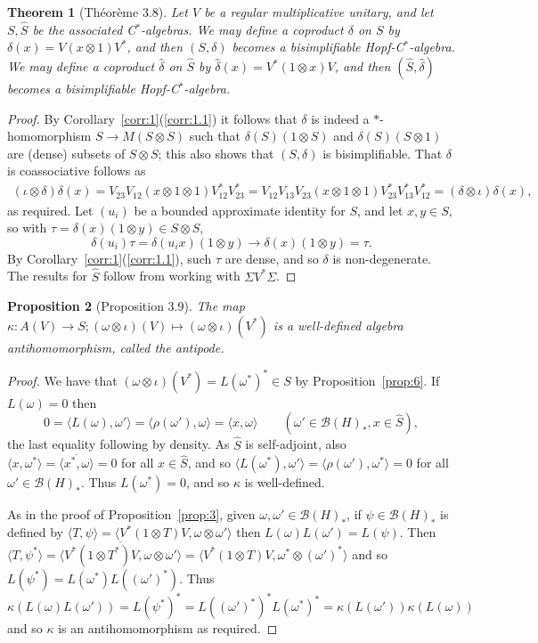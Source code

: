 \documentclass[a4paper,12pt]{article}
\theoremstyle{plain}
\newtheorem{proposition}{Proposition}[section]
\newtheorem{theorem}[proposition]{Theorem}
\theoremstyle{definition}
\newcommand{\ip}[2]{{\langle {#1} , {#2} \rangle}}
\newcommand{\mc}{\mathcal}
\begin{document}
\begin{theorem}[Th\'eor\`eme 3.8]\label{thm:1}
Let $V$ be a regular multiplicative unitary, and let $S,\hat S$ be the
associated C$^*$-algebras.  We may define a coproduct $\delta$ on $S$
by $\delta(x) = V(x\otimes 1)V^*$, and then $(S,\delta)$ becomes a
bisimplifiable Hopf-C$^*$-algebra.  We may define a coproduct $\hat\delta$
on $\hat S$ by $\hat\delta(x) = V^*(1\otimes x)V$, and then
$(\hat S,\hat\delta)$ becomes a bisimplifiable Hopf-C$^*$-algebra.
\end{theorem}
\begin{proof}
By Corollary~\ref{corr:1}(\ref{corr:1.1}) it follows that
$\delta$ is indeed a $*$-homomorphism $S\rightarrow M(S\otimes S)$
such that $\delta(S)(1\otimes S)$ and $\delta(S)(S\otimes 1)$
are (dense) subsets of $S\otimes S$; this also shows that $(S,\delta)$
is bisimplifiable.  That $\delta$ is coassociative follows as
\begin{align*} (\iota\otimes\delta)\delta(x)
= V_{23} V_{12} (x\otimes 1\otimes 1) V_{12}^* V_{23}^*
= V_{12} V_{13} V_{23}(x\otimes 1\otimes 1) V_{23}^* V_{13}^* V_{12}^*
= (\delta\otimes\iota)\delta(x), \end{align*}
as required.  Let $(u_i)$ be a bounded approximate identity for $S$,
and let $x,y\in S$, so with $\tau = \delta(x)(1\otimes y)\in S\otimes S$,
\[ \delta(u_i)\tau = \delta(u_ix)(1\otimes y)
\rightarrow \delta(x)(1\otimes y) = \tau. \]
By Corollary~\ref{corr:1}(\ref{corr:1.1}), such $\tau$ are dense,
and so $\delta$ is non-degenerate.  The results for $\hat S$ follow
from working with $\Sigma V^* \Sigma$.
\end{proof}

\begin{proposition}[Proposition 3.9]\label{prop:8}
The map $\kappa:A(V)\rightarrow S; (\omega\otimes\iota)(V)
\mapsto (\omega\otimes\iota)(V^*)$ is a well-defined algebra antihomomorphism,
called the \emph{antipode}.
\end{proposition}
\begin{proof}
We have that $(\omega\otimes\iota)(V^*) = L(\omega^*)^* \in S$
by Proposition~\ref{prop:6}.  If $L(\omega)=0$ then
\[ 0 = \ip{L(\omega)}{\omega'} = \ip{\rho(\omega')}{\omega}
= \ip{x}{\omega} \qquad (\omega'\in\mc B(H)_*,x\in\hat S), \]
the last equality following by density.  As $\hat S$ is self-adjoint,
also $\ip{x}{\omega^*} = \overline{\ip{x^*}{\omega}} = 0$ for all
$x\in \hat S$, and so $\ip{L(\omega^*)}{\omega'}
= \ip{\rho(\omega')}{\omega^*} = 0$ for all $\omega'\in\mc B(H)_*$.
Thus $L(\omega^*)=0$, and so $\kappa$ is well-defined.

As in the proof of Proposition~\ref{prop:3}, given $\omega,\omega'\in
\mc B(H)_*$, if $\psi\in\mc B(H)_*$ is defined by $\ip{T}{\psi}
= \ip{V^*(1\otimes T)V}{\omega\otimes\omega'}$ then $L(\omega) L(\omega')
= L(\psi)$.  Then $\ip{T}{\psi^*} = \overline{\ip{V^*(1\otimes T^*)V}
{\omega\otimes\omega'}} = \ip{V^*(1\otimes T)V}{\omega^*\otimes(\omega')^*}$
and so $L(\psi^*) = L(\omega^*)L((\omega')^*)$.
Thus $\kappa(L(\omega) L(\omega')) = L(\psi^*)^* = L((\omega')^*)^*
L(\omega^*)^* = \kappa(L(\omega')) \kappa(L(\omega))$ and so $\kappa$
is an antihomomorphism as required.
\end{proof}
\end{document}

